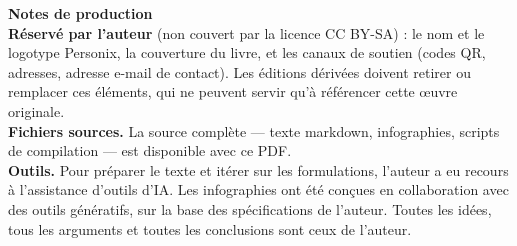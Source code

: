 \clearpage
\thispagestyle{empty}
\begin{flushleft}\small\sffamily
\textbf{Notes de production}\\[1.2em]

\textbf{Réservé par l'auteur} (non couvert par la licence CC BY-SA) : le
nom et le logotype Personix, la couverture du livre, et les canaux de soutien
(codes QR, adresses, adresse e-mail de contact). Les éditions dérivées doivent
retirer ou remplacer ces éléments, qui ne peuvent servir qu'à référencer cette
œuvre originale.\\[1.2em]

\textbf{Fichiers sources.} La source complète --- texte markdown, infographies,
scripts de compilation --- est disponible avec ce PDF.\\[1.2em]

\textbf{Outils.} Pour préparer le texte et itérer sur les formulations, l'auteur
a eu recours à l'assistance d'outils d'IA. Les infographies ont été conçues
en collaboration avec des outils génératifs, sur la base des spécifications de
l'auteur. Toutes les idées, tous les arguments et toutes les conclusions sont
ceux de l'auteur.
\end{flushleft}
\clearpage

